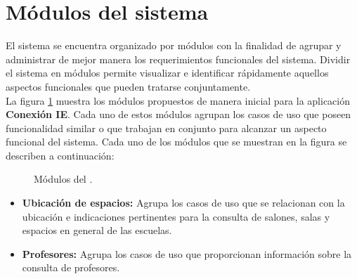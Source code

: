 
\section{Módulos del sistema}

    El sistema se encuentra organizado por módulos con la finalidad de agrupar y administrar de mejor manera los requerimientos funcionales del sistema. Dividir el sistema en módulos permite visualizar e identificar rápidamente aquellos aspectos funcionales que pueden tratarse conjuntamente. \\

    La figura \ref{fig:ModulosPAEAR} muestra los módulos propuestos de manera inicial para la aplicación \textbf{Conexión IE}. Cada uno de estos módulos agrupan los casos de uso que poseen funcionalidad similar o que trabajan en conjunto para alcanzar un aspecto funcional del sistema. Cada uno de los módulos que se muestran en la figura se describen a continuación:


    \begin{figure}[h!]
	\begin{center}
	\caption{Módulos del \saear.}
	\label{fig:ModulosPAEAR}
	\end{center}
    \end{figure}

    \begin{itemize}
	\item {\bf Ubicación de espacios:} Agrupa los casos de uso que se relacionan con la ubicación e indicaciones pertinentes para la consulta de salones, salas y espacios en general de las escuelas.

	\item {\bf Profesores:} Agrupa los casos de uso que proporcionan información sobre la consulta de profesores. 



    \end{itemize}

